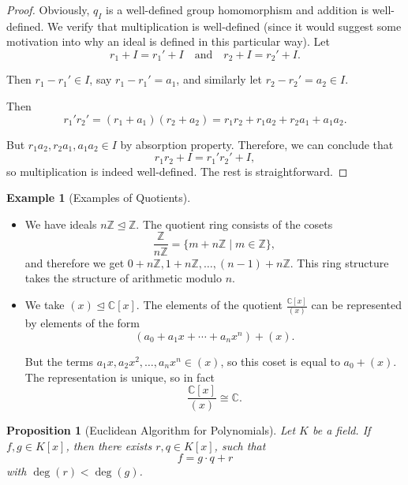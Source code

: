 \documentclass{article}
\newtheorem{proposition}[theorem]{Proposition}
\theoremstyle{definition}
\newtheorem{example}[theorem]{Example}
\theoremstyle{remark}
\newcommand{\pqty}[1]{\left(#1\right)}
\newcommand{\bqty}[1]{\left[#1\right]}
\newcommand{\set}[2]{\{#1\mid #2\}}
\newcommand{\flatfrac}[2]{\frac{#1}{#2}}
\newcommand{\qand}{\quad\text{and}\quad}
\newcommand{\isomorphic}{\cong}
\newcommand{\idealsub}{\trianglelefteq}
\newcommand{\ZZ}{\mathbb{Z}}
\newcommand{\CC}{\mathbb{C}}
\begin{document}
\begin{proof}
    Obviously, \(q_I\) is a well-defined group homomorphism and addition is well-defined. We verify that multiplication is well-defined (since it would suggest some motivation into why an ideal is defined in this particular way). Let
    \[
        r_1 + I = r_1' + I \qand r_2 + I = r_2' + I.
    \]

    Then \(r_1 - r_1' \in I\), say \(r_1 - r_1' = a_1\), and similarly let \(r_2 - r_2' = a_2 \in I\).

    Then
    \[
        r_1' r_2' = \pqty{r_1 + a_1} \pqty{r_2 + a_2} = r_1 r_2 + r_1 a_2 + r_2 a_1 + a_1 a_2.
    \]

    But \(r_1 a_2, r_2 a_1, a_1 a_2 \in I\) by absorption property. Therefore, we can conclude that
    \[
        r_1 r_2 + I = r_1' r_2' + I,
    \]
    so multiplication is indeed well-defined. The rest is straightforward.
\end{proof}

\begin{example}[Examples of Quotients]
    \label{ex:quotients}%
    \begin{itemize}
        \item We have ideals \(n \ZZ \idealsub \ZZ\). The quotient ring consists of the cosets
        \[
            \flatfrac{\ZZ}{n \ZZ} = \set{m + n \ZZ}{m \in \ZZ},
        \]
        and therefore we get \(0 + n \ZZ, 1 + n \ZZ, \ldots, \pqty{n - 1} + n\ZZ\). This ring structure takes the structure of arithmetic modulo \(n\).

        \item We take \(\pqty{x} \idealsub \CC\bqty{x}\). The elements of the quotient \(\flatfrac{\CC\bqty{x}}{\pqty{x}}\) can be represented by elements of the form
        \[
            \pqty{a_0 + a_1 x + \cdots + a_n x^n} + \pqty{x}.
        \]

        But the terms \(a_1 x, a_2 x^2, \ldots, a_n x^n \in \pqty{x}\), so this coset is equal to \(a_0 + \pqty{x}\). The representation is unique, so in fact
        \[
            \flatfrac{\CC \bqty{x}}{\pqty{x}} \isomorphic \CC.
        \]
    \end{itemize}
\end{example}

\begin{proposition}[Euclidean Algorithm for Polynomials]
    \label{prop:euclidean-algorithm-polynomials}%
    Let \(K\) be a field. If \(f, g \in K \bqty{x}\), then there exists \(r, q \in K \bqty{x}\), such that
    \[
        f = g \cdot q + r
    \]
    with \(\deg \pqty{r} < \deg \pqty{g}\).
\end{proposition}
\end{document}
